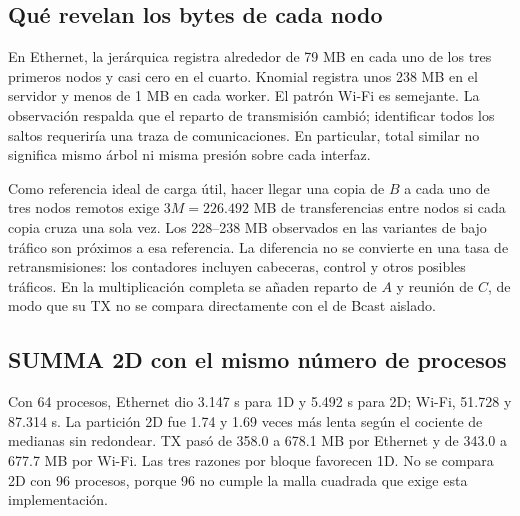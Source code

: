\subsection{Qué revelan los bytes de cada nodo}

\begin{table}[H]\caption{Medianas de TX por nodo, en MB. M96: multiplicación completa con 96 procesos; B16: difusión aislada con 16. Total: mediana de la suma por corrida, que puede diferir de la suma de las cuatro medianas.}\label{tab:tx-nodos}

\end{table}


En Ethernet, la jerárquica registra alrededor de 79 MB en cada uno de los tres primeros nodos y casi cero en el cuarto. Knomial registra unos 238 MB en el servidor y menos de 1 MB en cada worker. El patrón Wi-Fi es semejante. La observación respalda que el reparto de transmisión cambió; identificar todos los saltos requeriría una traza de comunicaciones. En particular, total similar no significa mismo árbol ni misma presión sobre cada interfaz.

Como referencia ideal de carga útil, hacer llegar una copia de $B$ a cada uno de tres nodos remotos exige $3M=226.492$ MB de transferencias entre nodos si cada copia cruza una sola vez. Los 228--238 MB observados en las variantes de bajo tráfico son próximos a esa referencia. La diferencia no se convierte en una tasa de retransmisiones: los contadores incluyen cabeceras, control y otros posibles tráficos. En la multiplicación completa se añaden reparto de $A$ y reunión de $C$, de modo que su TX no se compara directamente con el de Bcast aislado.

\subsection{SUMMA 2D con el mismo número de procesos}

Con 64 procesos, Ethernet dio 3.147 s para 1D y 5.492 s para 2D; Wi-Fi, 51.728 y 87.314 s. La partición 2D fue 1.74 y 1.69 veces más lenta según el cociente de medianas sin redondear. TX pasó de 358.0 a 678.1 MB por Ethernet y de 343.0 a 677.7 MB por Wi-Fi. Las tres razones por bloque favorecen 1D. No se compara 2D con 96 procesos, porque 96 no cumple la malla cuadrada que exige esta implementación.

